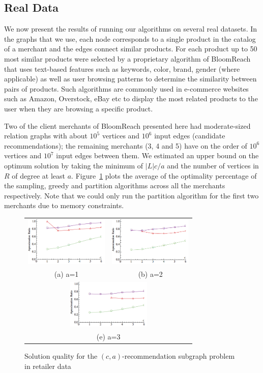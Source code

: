\subsection{Real Data}

We now present the results of running our algorithms on several real
datasets. In the graphs that we use, each node corresponds to a single
product in the catalog of a merchant and the edges connect similar
products. For each product up to 50 most similar products were
selected by a proprietary algorithm of BloomReach that uses text-based
features such as keywords, color, brand, gender (where applicable) as
well as user browsing patterns to determine the similarity between
pairs of products. Such algorithms are commonly used in e-commerce websites
such as Amazon, Overstock, eBay etc to display the most related products 
to the user when they are browsing a specific product. \vs

Two of the client merchants of BloomReach presented here had
moderate-sized relation graphs with about $10^5$ vertices and $10^6$
input edges (candidate recommendations); the remaining merchants (3, 4
and 5) have on the order of $10^6$ vertices and $10^7$ input edges
between them.  We estimated an upper bound on the optimum solution by
taking the minimum of $|L|c/a$ and the number of vertices in $R$ of
degree at least $a$. Figure~\ref{fig:real_combo} plots the average
of the optimality percentage of the sampling, greedy and partition
algorithms across all the merchants respectively. Note that we could
only run the partition algorithm for the first two merchants due to memory constraints. \vs

\begin{figure}
\begin{tabular}{cc}
  \includegraphics[width=40mm]{images/real_a=1_new.png} &   \includegraphics[width=40mm]{images/real_a=2_new.png} \\
(a) a=1 & (b) a=2 \\[6pt]
\multicolumn{2}{c}{\includegraphics[width=40mm]{images/real_a=3_new.png} }\\
\multicolumn{2}{c}{(e) a=3}
\end{tabular}
\caption{Solution quality for the $(c, a)$-recommendation subgraph problem in retailer data}
\label{fig:real_combo}
\end{figure}


